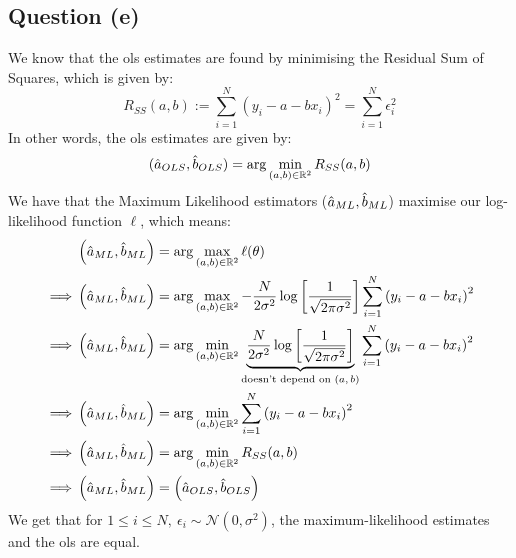 \documentclass[12pt]{article}
\begin{document}
\subsection{Question (e)}
We know that the \gls{ols} estimates are found by minimising the Residual Sum of Squares, which is given by:
\begin{equation*}
    R_{SS}(a,b) := \sum_{i=1}^N \left(y_i - a - bx_i\right)^2 = \sum_{i=1}^N \epsilon_i^2
\end{equation*}
In other words, the \gls{ols} estimates are given by:
\begin{equation*}
    (\hat a_{OLS}, \hat b_{OLS}) = \arg \min_{(a,b) \in \mathbb{R}^2} R_{SS}(a,b)
\end{equation*}
We have that the Maximum Likelihood estimators (\(\hat a_{ML}, \hat b_{ML}\)) maximise our log-likelihood function \(\ell\), which means:
\begin{align*}
             &
    \left(\hat a_{ML}, \hat b_{ML}\right) = \arg \max_{(a,b) \in \mathbb{R}^2} \ell(\theta)                                                                                                                                                            \\
    \implies &
    \left(\hat a_{ML}, \hat b_{ML}\right) = \arg \max_{(a,b) \in \mathbb{R}^2} -\frac{N}{2 \sigma^2}\log \left[\frac{1}{\sqrt{2 \pi \sigma^{2}}}\right] \sum_{i=1}^N \left(y_i - a - bx_i\right)^{2}                                                   \\
    \implies &
    \left(\hat a_{ML}, \hat b_{ML}\right) = \arg \min_{(a,b) \in \mathbb{R}^2} \underbrace{\frac{N}{2 \sigma^2}\log \left[\frac{1}{\sqrt{2 \pi \sigma^{2}}}\right]}_{\text{doesn't depend on \((a, b)\)}} \sum_{i=1}^N \left(y_i - a - bx_i\right)^{2} \\
    \implies &
    \left(\hat a_{ML}, \hat b_{ML}\right) = \arg \min_{(a,b) \in \mathbb{R}^2} \sum_{i=1}^N \left(y_i - a - bx_i\right)^{2}                                                                                                                            \\
    \implies &
    \left(\hat a_{ML}, \hat b_{ML}\right) = \arg \min_{(a,b) \in \mathbb{R}^2} R_{SS}(a,b)                                                                                                                                                             \\
    \implies &
    \left(\hat a_{ML}, \hat b_{ML}\right) = \left(\hat a_{OLS}, \hat b_{OLS}\right)                                                                                                                                                                          \\
\end{align*}
We get that for \(1 \leq i \leq N, \ \epsilon_i \sim \mathcal{N}\left(0, \sigma^2\right)\), the maximum-likelihood estimates and the \gls{ols} are equal.
\end{document}
